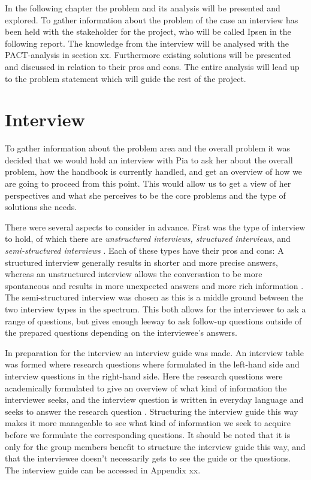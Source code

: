 In the following chapter the problem and its analysis will be presented and explored. 
To gather information about the problem of the case an interview has been held with the stakeholder for the project, who will be called Ipsen in the following report.
The knowledge from the interview will be analysed with the PACT-analysis in section xx.
Furthermore existing solutions will be presented and discussed in relation to their pros and cons.
The entire analysis will lead up to the problem statement which will guide the rest of the project.

\section{Interview}

To gather information about the problem area and the overall problem it was decided that
we would hold an interview with Pia to ask her about the overall problem, how the handbook is currently handled, and get an overview of how we are going to proceed from this point. This would allow us to get a view of her perspectives and what she perceives to be the core problems and the type of solutions she needs.

There were several aspects to consider in advance. First was the type of interview to hold, of which there are \textit{unstructured interviews, structured interviews}, and \textit{semi-structured interviews} \citep{interactionhci}. Each of these types have their pros and cons: A structured interview generally results in shorter and more precise answers, whereas an unstructured interview allows the conversation to be more spontaneous and results in more unexpected answers and more rich information \citep{interview}. The semi-structured interview was chosen as this is a middle ground between the two interview types in the spectrum. This both allows for the interviewer to ask a range of questions, but gives enough leeway to ask follow-up questions outside of the prepared questions depending on the interviewee’s answers.

In preparation for the interview an interview guide was made. An interview table was formed where research questions where formulated in the left-hand side and interview questions in the right-hand side. Here the research questions were academically formulated to give an overview of what kind of information the interviewer seeks, and the interview question is written in everyday language and seeks to answer the research question \citep{interview}. Structuring the interview guide this way makes it more manageable to see what kind of information we seek to acquire before we formulate the corresponding questions. It should be noted that it is only for the group members benefit to structure the interview guide this way, and that the interviewee doesn’t necessarily gets to see the guide or the questions. The interview guide can be accessed in Appendix xx.

